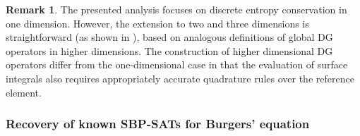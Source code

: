 \documentclass[preprint,10pt]{article}
\theoremstyle{definition}
\theoremstyle{lemma}
\newtheorem*{remark}{Remark}
\theoremstyle{theorem}
\theoremstyle{assumption}
\begin{document}
\begin{remark}
The presented analysis focuses on discrete entropy conservation in one dimension.  However, the extension to two and three dimensions is straightforward (as shown in \cite{chen2017entropy}), based on analogous definitions of global DG operators in higher dimensions.  The construction of higher dimensional DG operators differ from the one-dimensional case in that the evaluation of surface integrals also requires appropriately accurate quadrature rules over the reference element.  
\end{remark}


\subsubsection{Recovery of known SBP-SATs for Burgers' equation}
\label{sec:recovery}
\end{document}
